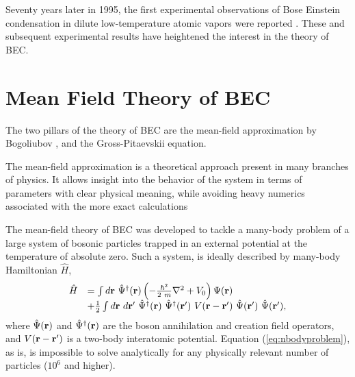 \documentclass[%
   final       %
]{prospectus}
\begin{document}
Seventy years later in 1995, the first experimental observations of
Bose Einstein condensation in dilute low-temperature atomic vapors were
reported \cite{Andersonetal1995,Davisetal1995}. 
These and subsequent experimental results have heightened the interest in the
theory of BEC.

\section*{Mean Field Theory of BEC}

The two pillars of the theory of BEC are the mean-field approximation by 
Bogoliubov \cite{Bogoliubov1947}, and the Gross-Pitaevskii equation.

The mean-field approximation is a theoretical approach present in many
branches of physics. It allows insight into the
behavior of the system in terms of parameters with clear physical meaning,
while avoiding heavy numerics associated with the more exact calculations

The mean-field theory of BEC was developed to tackle
a many-body problem of a large system of bosonic particles trapped in 
an external potential at the temperature of absolute zero. Such a system, is
ideally described by many-body Hamiltonian $\hat H$,
\begin{equation}
  \label{eq:nbodyproblem}
  \begin{array}[t]{rl}
  \hat H & = \int d {\bf r } \ \hat \Psi^{\dagger}( {\bf r} )
  \left( - \frac {\hbar^2} {2 \ m} \nabla^2 + V_{0}
    \right) \Psi ( {\bf r} ) \\
  & + \frac 1 2 \int d {\bf r }\ d {\bf r' } \ 
  \hat \Psi^{\dagger}( {\bf r} ) \ \hat \Psi^{\dagger}( {\bf r'} ) \ 
  V( {\bf r} - {\bf r'}) \ \hat \Psi( {\bf r'} ) \ \hat \Psi( {\bf r'} ),
  \end{array}
\end{equation}
where $\hat \Psi( {\bf r} )$ and $\hat \Psi^{\dagger} ( {\bf r} )$ are
the boson annihilation and creation field operators, and
$V( {\bf r} - {\bf r'})$ is a two-body interatomic
potential.  Equation (\ref{eq:nbodyproblem}), as is, is impossible to solve
analytically for any physically relevant number of particles ($10^6$ and 
higher). 
\end{document}
